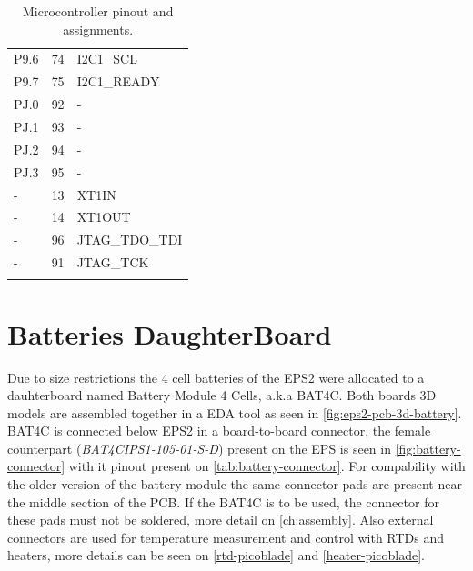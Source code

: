 \begin{longtable}{lcl}
    P9.6              & 74                  & I2C1\_SCL             \\
    P9.7              & 75                  & I2C1\_READY           \\
    \midrule
    PJ.0              & 92                  & -                     \\
    PJ.1              & 93                  & -                     \\
    PJ.2              & 94                  & -                     \\
    PJ.3              & 95                  & -                     \\
    \midrule
    -                 & 13                  & XT1IN                 \\
    -                 & 14                  & XT1OUT                \\
    -                 & 96                  & JTAG\_TDO\_TDI        \\
    -                 & 91                  & JTAG\_TCK             \\
    \bottomrule[1.5pt]
    \caption{Microcontroller pinout and assignments.}
    \label{tab:mcu-pinout}
\end{longtable}

\section{Batteries DaughterBoard}

Due to size restrictions the 4 cell batteries of the EPS2 were allocated to a dauhterboard named Battery Module 4 Cells, a.k.a BAT4C\cite{bat4c}. Both boards 3D models are assembled together in a EDA tool as seen in \autoref{fig:eps2-pcb-3d-battery}. BAT4C is connected below EPS2 in a board-to-board connector, the female counterpart (\textit{BAT4CIPS1-105-01-S-D}) present on the EPS is seen in \autoref{fig:battery-connector} with it pinout present on \autoref{tab:battery-connector}. For compability with the older version of the battery module the same connector pads are present near the middle section of the PCB. If the BAT4C is to be used, the connector for these pads must not be soldered, more detail on \autoref{ch:assembly}. Also external connectors are used for temperature measurement and control with RTDs and heaters, more details can be seen on \autoref{rtd-picoblade} and \autoref{heater-picoblade}. 

